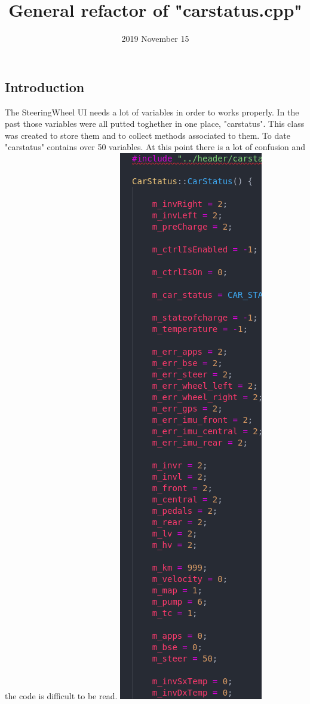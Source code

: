 \documentclass[12pt, letterpaper]{article}
\title{General refactor of "carstatus.cpp"}
\date{2019 November 15}
\begin{document}
\begin{titlepage}
\maketitle
\end{titlepage}

\begin{flushleft}

\section{Introduction}
	The SteeringWheel UI needs a lot of variables in order to works properly. In the past those variables were all putted toghether in one place, "carstatus". This class was created to store them and to collect methods associated to them. To date "carstatus" contains over 50 variables. At this point there is a lot of confusion and the code is difficult to be read.
\newline
\newline
\includegraphics[scale=1.5]{code.png}

\end{flushleft}
\end{document}
